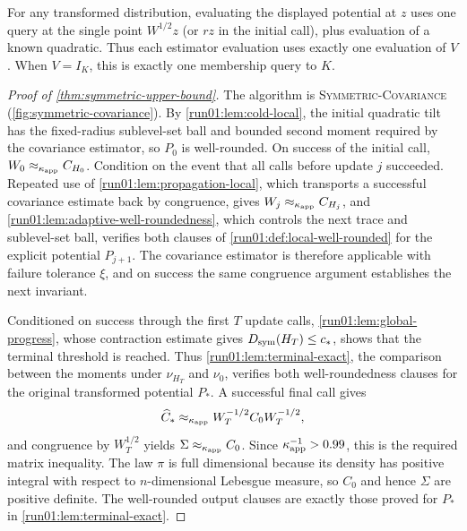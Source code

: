\documentclass[11pt]{article}
\numberwithin{equation}{section}
\theoremstyle{definition}
\newcommand{\algname}[1]{\textnormal{\textsc{#1}}}
\begin{document}
For any transformed distribution, evaluating the displayed potential at $z$ uses
one query at the single point
$W^{1/2}z$ (or
$rz$ in the initial call), plus evaluation of a known quadratic.
Thus each estimator evaluation uses exactly one evaluation of $V$.
When $V=I_K$, this is exactly one membership query to
$K$.

\begin{proof}[Proof of \cref{thm:symmetric-upper-bound}]
The algorithm is \algname{Symmetric-Covariance}
(\cref{fig:symmetric-covariance}).
By \cref{run01:lem:cold-local}, the initial quadratic tilt has the fixed-radius
sublevel-set ball and bounded second moment required by the covariance
estimator, so $P_0$ is well-rounded.
On success of the initial call, $W_0\approx_{\kappa_{\rm app}}C_{H_0}$.
Condition on the event that all calls before update $j$ succeeded.
Repeated use of \cref{run01:lem:propagation-local}, which transports a
successful covariance estimate back by congruence, gives
$W_j\approx_{\kappa_{\rm app}}C_{H_j}$, and
\cref{run01:lem:adaptive-well-roundedness}, which controls the next trace and
sublevel-set ball, verifies both clauses of \cref{run01:def:local-well-rounded}
for the explicit potential
$P_{j+1}$.
The covariance estimator is therefore applicable with failure tolerance $\xi$,
and on success the same congruence argument establishes the next invariant.

Conditioned on success through the first $T$ update calls,
\cref{run01:lem:global-progress}, whose contraction estimate gives
$D_{\rm sym}(H_T)\leq c_*$, shows that the terminal threshold is reached.
Thus \cref{run01:lem:terminal-exact}, the comparison between the moments under
$\nu_{H_T}$ and
$\nu_0$, verifies both well-roundedness clauses for the original transformed
potential
$P_*$.
A successful final call gives
\[
 \widehat C_*\approx_{\kappa_{\rm app}}
 W_T^{-1/2}C_0W_T^{-1/2},
\]
and congruence by $W_T^{1/2}$ yields
$\Sigma\approx_{\kappa_{\rm app}}C_0$.
Since $\kappa_{\rm app}^{-1}>0.99$, this is the required matrix inequality.
The law $\pi$ is full dimensional because its density has positive integral with
respect to
$n$-dimensional Lebesgue measure, so
$C_0$ and hence
$\Sigma$ are positive definite.
The well-rounded output clauses are exactly those proved for $P_*$ in
\cref{run01:lem:terminal-exact}.


\end{proof}
\end{document}
